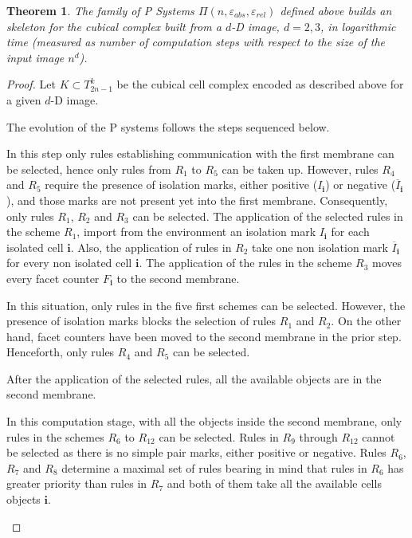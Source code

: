 \documentclass[journal]{IEEEtran}
\newtheorem{theorem}{Theorem}
\begin{document}
\begin{theorem}
The family of P Systems $\Pi(n, \varepsilon_{abs}, \varepsilon_{rel})$ defined above builds an skeleton for the
cubical complex built from a $d$-D image, $d=2,3$, in logarithmic time (measured as number of computation steps 
with respect to the size of the input image $n^d$). 
\end{theorem}
\begin{proof}

Let $K \subset T_{2n-1}^k$ be the cubical cell complex encoded as described above for a given $d$-D image.

The evolution of the P systems follows the steps sequenced below.
\begin{list}{\textbf{Step }}{}
\item In this step only rules establishing communication with the first membrane
can be selected, hence only rules from $R_1$ to $R_5$ can be taken
up. However, rules $R_4$ and $R_5$ require the presence of isolation
marks, either positive ($I_\mathbf{i}$) or negative
($\overline{I}_\mathbf{i}$), and those marks are not present yet
into the first membrane. Consequently, only rules $R_1$, $R_2$ and
$R_3$ can be selected. The application of the selected rules in the
scheme $R_1$, import from the environment an isolation mark
$I_\mathbf{i}$ for each isolated cell $\mathbf{i}$. Also, the
application of rules in $R_2$ take one non isolation mark
$\overline{I}_\mathbf{i}$ for every non isolated cell $\mathbf{i}$.
The application of the rules in the scheme $R_3$ moves every facet
counter $F_\mathbf{i}$ to the second membrane.
\item In this situation, only rules in the five first schemes can be selected.
However, the presence of isolation marks blocks the selection of
rules $R_1$ and $R_2$. On the other hand, facet counters have been
moved to the second membrane in the prior step. Henceforth, only
rules $R_4$ and $R_5$ can be selected.

After the application of the selected rules, all the available objects are in
the second membrane.
\item In this computation stage, with all the objects inside the second
membrane, only rules in the schemes $R_6$ to $R_{12}$ can be selected. Rules in
$R_9$ through $R_{12}$ cannot be selected as there is no simple pair marks,
either positive or negative. Rules $R_6$, $R_7$ and $R_8$ determine a maximal
set of rules bearing in mind that rules in $R_6$ has greater priority than rules
in $R_7$ and both of them take all the available cells objects $\mathbf{i}$.


\end{list}
\end{proof}
\end{document}
